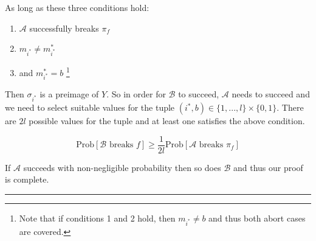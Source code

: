 \documentclass[twoside]{article}
\newenvironment{proof}{{\bf Proof:}}{\hfill\rule{2mm}{2mm}}
\begin{document}
\begin{proof}
As long as these three conditions hold:
\begin{enumerate}
\item $\mathcal{A}$ successfully breaks $\pi_f$
\item $m_{i^*} \neq m^*_{i^*}$
\item and $m^*_{i^*} = b$ \footnote{Note that if conditions 1 and 2 hold, then $m_{i^*} \neq b$ and thus both abort cases are covered.}
\end{enumerate}

Then $\sigma_{i^*}$ is a preimage of $Y$. So in order for $\mathcal{B}$ to succeed, $\mathcal{A}$ needs to succeed and we need to select suitable values for the tuple $(i^*,b) \in \{1,...,l\} \times \{0,1\}$. There are $2l$ possible values for the tuple and at least one satisfies the above condition.

$$\text{Prob}[\mathcal{B}\text{ breaks }f] \geq \frac{1}{2l}\text{Prob}[\mathcal{A}\text{ breaks }\pi_f]$$

If $\mathcal{A}$ succeeds with non-negligible probability then so does $\mathcal{B}$ and thus our proof is complete.
\end{proof}
\end{document}
